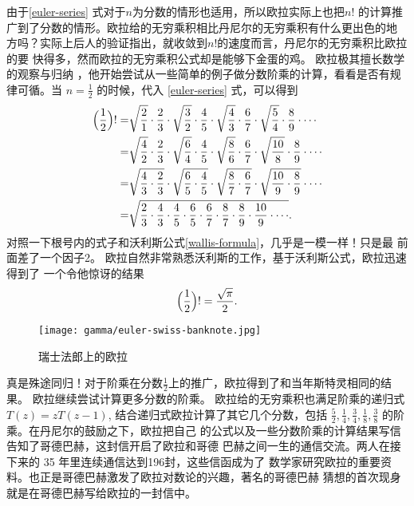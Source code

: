 {由于\eqref{euler-series} 式对于$n$为分数的情形也适用，所以欧拉实际上也把$n!$
的计算推广到了分数的情形。欧拉给的无穷乘积相比丹尼尔的无穷乘积有什么更出色的地
方吗？实际上后人的验证指出，就收敛到$n!$的速度而言，丹尼尔的无穷乘积比欧拉的要
快得多，然而欧拉的无穷乘积公式却是能够下金蛋的鸡。 欧拉极其擅长数学的观察与归纳
，他开始尝试从一些简单的例子做分数阶乘的计算，看看是否有规律可循。当
$n=\frac{1}{2}$ 的时候，代入 \eqref{euler-series} 式，可以得到
\begin{align*}
\Bigl(\frac{1}{2}\Bigr)! 
= & \sqrt{\frac{2}{1}} \cdot \frac{2}{3} \cdot \sqrt{\frac{3}{2}} \cdot \frac{4}{5} 
    \cdot \sqrt{\frac{4}{3}} \cdot \frac{6}{7} \cdot \sqrt{\frac{5}{4}} \cdot \frac{8}{9} 
    \cdot \cdots  \\
= & \sqrt{\frac{4}{2}} \cdot \frac{2}{3} \cdot \sqrt{\frac{6}{4}} \cdot \frac{4}{5}
    \cdot \sqrt{\frac{8}{6}} \cdot \frac{6}{7} \cdot \sqrt{\frac{10}{8}} \cdot \frac{8}{9} 
    \cdot \cdots  \\
= & \sqrt{\frac{4}{3} \cdot \frac{2}{3}} \cdot \sqrt{\frac{6}{5} \cdot \frac{4}{5}}
    \cdot \sqrt{\frac{8}{7} \cdot \frac{6}{7}} \cdot \sqrt{\frac{10}{9} \cdot \frac{8}{9}} 
    \cdot \cdots  \\
= & \sqrt{\frac{2}{3} \cdot \frac{4}{3} \cdot \frac{4}{5} \cdot \frac{6}{5}
    \cdot \frac{6}{7} \cdot \frac{8}{7} \cdot \frac{8}{9} \cdot \frac{10}{9} \cdot \cdots } . 
\end{align*}
对照一下根号内的式子和沃利斯公式\eqref{wallis-formula}，几乎是一模一样！只是最
前面差了一个因子2。 欧拉自然非常熟悉沃利斯的工作，基于沃利斯公式，欧拉迅速得到了
一个令他惊讶的结果
$$ \Bigl(\frac{1}{2}\Bigr)! = \frac{\sqrt{\pi}}{2} .$$

\begin{figure}[htbp]
\centering
\texttt{[image: gamma/euler-swiss-banknote.jpg]}
\caption{瑞士法郎上的欧拉}
\end{figure}

真是殊途同归！对于阶乘在分数$\frac{1}{2}$上的推广，欧拉得到了和当年斯特灵相同的结
果。 欧拉继续尝试计算更多分数的阶乘。 欧拉给的无穷乘积也满足阶乘的递归式$T(z)
= z T(z-1)$, 结合递归式欧拉计算了其它几个分数，包括 $\frac{5}{2}, \frac{1}{4},
\frac{3}{4}, \frac{1}{8}, \frac{3}{8} $ 的阶乘。在丹尼尔的鼓励之下，欧拉把自己
的公式以及一些分数阶乘的计算结果写信告知了哥德巴赫，这封信开启了欧拉和哥德
巴赫之间一生的通信交流。两人在接下来的 35 年里连续通信达到196封，这些信函成为了
数学家研究欧拉的重要资料。也正是哥德巴赫激发了欧拉对数论的兴趣，著名的哥德巴赫
猜想的首次现身就是在哥德巴赫写给欧拉的一封信中。

}
